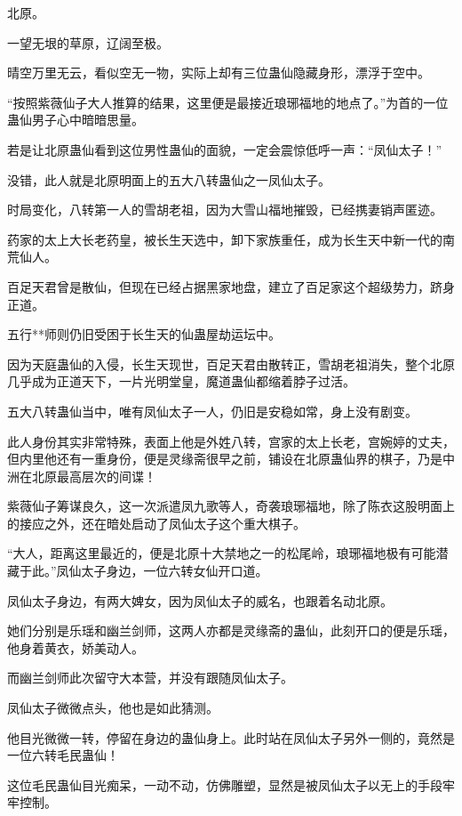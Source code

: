 
\begin{this_body}

北原。

一望无垠的草原，辽阔至极。

晴空万里无云，看似空无一物，实际上却有三位蛊仙隐藏身形，漂浮于空中。

“按照紫薇仙子大人推算的结果，这里便是最接近琅琊福地的地点了。”为首的一位蛊仙男子心中暗暗思量。

若是让北原蛊仙看到这位男性蛊仙的面貌，一定会震惊低呼一声：“凤仙太子！”

没错，此人就是北原明面上的五大八转蛊仙之一凤仙太子。

时局变化，八转第一人的雪胡老祖，因为大雪山福地摧毁，已经携妻销声匿迹。

药家的太上大长老药皇，被长生天选中，卸下家族重任，成为长生天中新一代的南荒仙人。

百足天君曾是散仙，但现在已经占据黑家地盘，建立了百足家这个超级势力，跻身正道。

五行**师则仍旧受困于长生天的仙蛊屋劫运坛中。

因为天庭蛊仙的入侵，长生天现世，百足天君由散转正，雪胡老祖消失，整个北原几乎成为正道天下，一片光明堂皇，魔道蛊仙都缩着脖子过活。

五大八转蛊仙当中，唯有凤仙太子一人，仍旧是安稳如常，身上没有剧变。

此人身份其实非常特殊，表面上他是外姓八转，宫家的太上长老，宫婉婷的丈夫，但内里他还有一重身份，便是灵缘斋很早之前，铺设在北原蛊仙界的棋子，乃是中洲在北原最高层次的间谍！

紫薇仙子筹谋良久，这一次派遣凤九歌等人，奇袭琅琊福地，除了陈衣这股明面上的接应之外，还在暗处启动了凤仙太子这个重大棋子。

“大人，距离这里最近的，便是北原十大禁地之一的松尾岭，琅琊福地极有可能潜藏于此。”凤仙太子身边，一位六转女仙开口道。

凤仙太子身边，有两大婢女，因为凤仙太子的威名，也跟着名动北原。

她们分别是乐瑶和幽兰剑师，这两人亦都是灵缘斋的蛊仙，此刻开口的便是乐瑶，他身着黄衣，娇美动人。

而幽兰剑师此次留守大本营，并没有跟随凤仙太子。

凤仙太子微微点头，他也是如此猜测。

他目光微微一转，停留在身边的蛊仙身上。此时站在凤仙太子另外一侧的，竟然是一位六转毛民蛊仙！

这位毛民蛊仙目光痴呆，一动不动，仿佛雕塑，显然是被凤仙太子以无上的手段牢牢控制。


\end{this_body}
